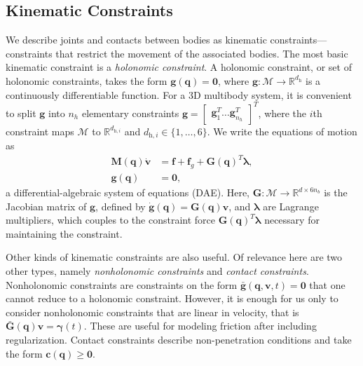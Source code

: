 \documentclass[preprint,12pt]{elsarticle}
\let\vec\bm
\let\mat\mathbf
\numberwithin{equation}{section}
\def\conf{q}
\def\th{\text{h}}
\begin{document}
\subsection{Kinematic Constraints}
We describe joints and contacts between bodies as kinematic constraints---constraints that restrict the movement of the associated bodies.
The most basic kinematic constraint is a \textit{holonomic constraint}.
A holonomic constraint, or set of holonomic constraints, takes the form $\vec{g}(\vec{\conf}) = \vec{0}$, where $\vec{g}: \mathcal{M} \rightarrow \mathbb{R}^{d_{\th}}$ is a continuously differentiable function.
For a 3D multibody system, it is convenient to split $\vec{g}$ into $n_h$ elementary constraints $\vec{g} = \begin{bmatrix} \vec{g}_1^T \hdots \vec{g}_{n_h}^T \end{bmatrix}^T$, where the $i$th constraint maps $\mathcal{M}$ to $\mathbb{R}^{d_{\th, i}}$ and $d_{\th, i}\in\{1,\hdots,6\}$.
We write the equations of motion as
\begin{align}
    \label{eq:manipulator}
    \mat{M} (\vec{\conf}) \dot{\vec{v}} & = \vec{f} + \vec{f}_g + \mat{G}(\vec{\conf})^T \vec{\lambda}, \\
    \label{eq:manipulator2}
    \vec{g}(\vec{\conf})                & = \vec{0},
\end{align}
a differential-algebraic system of equations (DAE).
Here, $\mat{G}: \mathcal{M} \to \mathbb{R}^{d \times 6n_b}$ is the Jacobian matrix of $\vec{g}$, defined by $\dot{\vec{g}}(\vec{\conf}) = \mat{G}(\vec{\conf}) \vec{v}$, and $\vec{\lambda}$ are Lagrange multipliers, which couples to the constraint force $\mat{G}(\vec{\conf})^T \vec{\lambda}$ necessary for maintaining the constraint.

Other kinds of kinematic constraints are also useful.
Of relevance here are two other types, namely \emph{nonholonomic constraints} and \emph{contact constraints}. Nonholonomic constraints are constraints on the form $\bar{\vec{g}}(\vec{\conf}, \vec{v}, t) = \vec{0}$ that one cannot reduce to a holonomic constraint.
However, it is enough for us only to consider nonholonomic constraints that are linear in velocity, that is $\bar{\mat{G}}(\vec{\conf}) \vec{v} = \vec{\gamma}(t)$.
These are useful for modeling friction after including regularization.
Contact constraints describe non-penetration conditions and take the form $\vec{c}(\vec{\conf}) \geq \vec{0}$.
\end{document}

